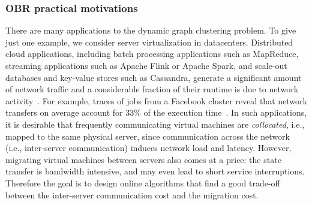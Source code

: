 \subsubsection{OBR practical motivations}


There are many applications to the dynamic graph clustering problem.
To give just one example, we consider server virtualization in
datacenters. Distributed cloud applications, including batch processing
applications such as MapReduce, streaming applications such as Apache Flink or
Apache Spark, and scale-out databases and key-value stores such as Cassandra,
generate a significant amount of network traffic and a considerable fraction
of their runtime is due to network acti\-vi\-ty~\cite{MogPop12}. For example,
traces of jobs from a Facebook cluster reveal that network transfers on
average account for 33\% of the execution time~\cite{ChZMJS11}. In such
applications, it is desirable that frequently communicating virtual machines
are \emph{collocated}, i.e., mapped to the same physical server, since
communication across the network (i.e., inter-server communication) induces
network load and latency. However, migrating virtual machines between servers
also comes at a price: the state transfer is bandwidth intensive, and may even
lead to short service interruptions. Therefore the goal is to design online
algorithms that find a good trade-off between the inter-server communication
cost and the migration cost.


